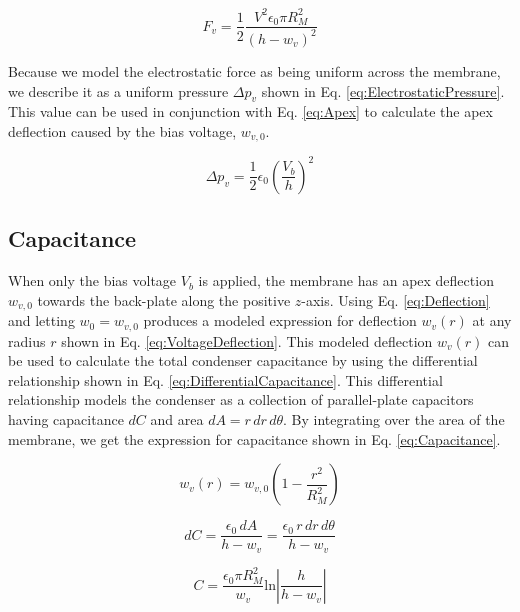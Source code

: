 \documentclass[journal]{IEEEtran}
\begin{document}
\begin{figure}[ht]
	\begin{equation}
		F_v = \frac{1}{2}\frac{V^2\epsilon_0\pi R_M^2}{(h-w_v)^2}
		\label{eq:ElectrostaticForce}
	\end{equation}
\end{figure}

Because we model the electrostatic force as being uniform across the membrane, we describe it as a uniform pressure $\Delta p_v$ shown in Eq. \ref{eq:ElectrostaticPressure}.\supercite{aip} This value can be used in conjunction with Eq. \ref{eq:Apex} to calculate the apex deflection caused by the bias voltage, $w_{v,0}$.

\begin{figure}[ht]
	\begin{equation}
		\Delta p_v = \frac{1}{2}\epsilon_0\left(\frac{V_b}{h}\right)^2
		\label{eq:ElectrostaticPressure}
	\end{equation}
\end{figure}

\subsection{Capacitance}

When only the bias voltage $V_b$ is applied, the membrane has an apex deflection $w_{v,0}$ towards the back-plate along the positive $z$-axis. Using Eq. \ref{eq:Deflection} and letting $w_0=w_{v,0}$ produces a modeled expression for deflection $w_v(r)$ at any radius $r$ shown in Eq. \ref{eq:VoltageDeflection}. This modeled deflection $w_v(r)$ can be used to calculate the total condenser capacitance by using the differential relationship shown in Eq. \ref{eq:DifferentialCapacitance}. This differential relationship models the condenser as a collection of parallel-plate capacitors having capacitance $dC$ and area $dA=r\,dr\,d\theta$. By integrating over the area of the membrane, we get the expression for capacitance shown in Eq. \ref{eq:Capacitance}.

\begin{figure}[ht]
	\begin{equation}
		w_v(r) = w_{v,0}\left(1-\frac{r^2}{R_M^2}\right)
		\label{eq:VoltageDeflection}
	\end{equation}
	
	\begin{equation}
		dC = \frac{\epsilon_0\,dA}{h-w_v} = \frac{\epsilon_0\,r\,dr\,d\theta}{h-w_v}
		\label{eq:DifferentialCapacitance}
	\end{equation}

	\begin{equation}
		C = \frac{\epsilon_0\pi R_M^2}{w_v} \mathrm{ln}\left|\frac{h}{h-w_v}\right|
		\label{eq:Capacitance}
	\end{equation}
\end{figure}
\end{document}
